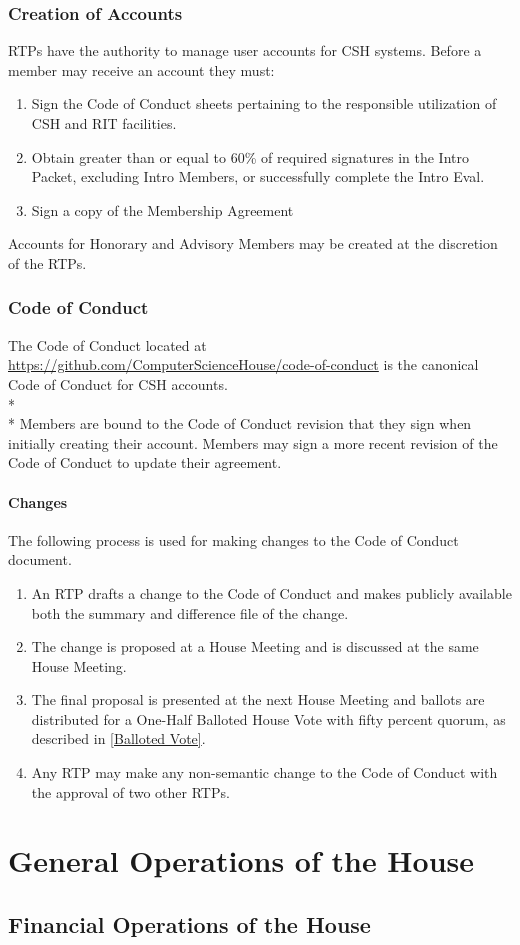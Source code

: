 \documentclass{article}
\newcommand{\article}[1]{\section{#1} \label{#1}}
\newcommand{\asection}[1]{\subsection{#1} \label{#1}}
\newcommand{\asubsection}[1]{\subsubsection{#1} \label{#1}}
\newcommand{\asubsubsection}[1]{\paragraph{#1} \label{#1}}
\begin{document}
\asubsection{Creation of Accounts}
RTPs have the authority to manage user accounts for CSH systems.
Before a member may receive an account they must:
\renewcommand{\theenumi}{\arabic{enumi}} %
\begin{enumerate}
	\item Sign the Code of Conduct sheets pertaining to the responsible utilization of CSH and RIT facilities.
	\item Obtain greater than or equal to 60\% of required signatures in the Intro Packet, excluding Intro Members, or successfully complete the Intro Eval.
	\item Sign a copy of the Membership Agreement
\end{enumerate}
Accounts for Honorary and Advisory Members may be created at the discretion of the RTPs.

\asubsection{Code of Conduct}
The Code of Conduct located at \url{https://github.com/ComputerScienceHouse/code-of-conduct} is the canonical Code of Conduct for CSH accounts.
\\* \\*
Members are bound to the Code of Conduct revision that they sign when initially creating their account.
Members may sign a more recent revision of the Code of Conduct to update their agreement.

\asubsubsection{Changes}
\renewcommand{\theenumi}{\alph{enumi}} %
The following process is used for making changes to the Code of Conduct document.
\begin{enumerate}
	\item An RTP drafts a change to the Code of Conduct and makes publicly available both the summary and difference file of the change.
	\item The change is proposed at a House Meeting and is discussed at the same House Meeting.
	\item The final proposal is presented at the next House Meeting and ballots are distributed for a One-Half Balloted House Vote with fifty percent quorum, as described in \ref{Balloted Vote}.
	\item Any RTP may make any non-semantic change to the Code of Conduct with the approval of two other RTPs.
\end{enumerate}

\article{General Operations of the House}

\asection{Financial Operations of the House}
\end{document}
